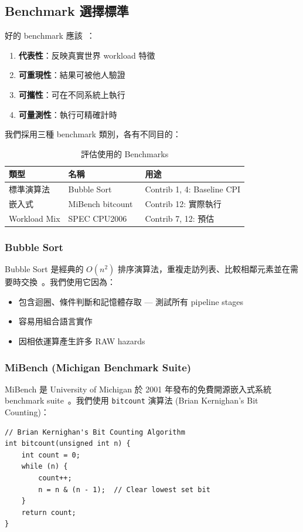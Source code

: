 \documentclass[journal]{IEEEtran}
\begin{document}
\subsection{Benchmark 選擇標準}
好的 benchmark 應該~\cite{hennessy2017computer}：
\begin{enumerate}
    \item \textbf{代表性}：反映真實世界 workload 特徵
    \item \textbf{可重現性}：結果可被他人驗證
    \item \textbf{可攜性}：可在不同系統上執行
    \item \textbf{可量測性}：執行可精確計時
\end{enumerate}

我們採用三種 benchmark 類別，各有不同目的：

\begin{table}[!t]
\centering
\caption{評估使用的 Benchmarks}
\label{tab:benchmarks}
\footnotesize
\begin{tabular}{@{}p{1.8cm}p{2cm}p{3.5cm}@{}}
\toprule
\textbf{類型} & \textbf{名稱} & \textbf{用途} \\
\midrule
標準演算法 & Bubble Sort~\cite{knuth1998art} & Contrib 1, 4: Baseline CPI \\
嵌入式 & MiBench bitcount~\cite{guthaus2001mibench} & Contrib 12: 實際執行 \\
Workload Mix & SPEC CPU2006~\cite{phansalkar2007analysis} & Contrib 7, 12: 預估 \\
\bottomrule
\end{tabular}
\end{table}

\subsubsection{Bubble Sort}
Bubble Sort 是經典的 $O(n^2)$ 排序演算法，重複走訪列表、比較相鄰元素並在需要時交換~\cite{knuth1998art}。我們使用它因為：
\begin{itemize}
    \item 包含迴圈、條件判斷和記憶體存取 --- 測試所有 pipeline stages
    \item 容易用組合語言實作
    \item 因相依運算產生許多 RAW hazards
\end{itemize}

\subsubsection{MiBench (Michigan Benchmark Suite)}
MiBench 是 University of Michigan 於 2001 年發布的免費開源嵌入式系統 benchmark suite~\cite{guthaus2001mibench}。我們使用 \texttt{bitcount} 演算法 (Brian Kernighan's Bit Counting)：
\begin{lstlisting}
// Brian Kernighan's Bit Counting Algorithm
int bitcount(unsigned int n) {
    int count = 0;
    while (n) {
        count++;
        n = n & (n - 1);  // Clear lowest set bit
    }
    return count;
}
\end{lstlisting}
\end{document}
